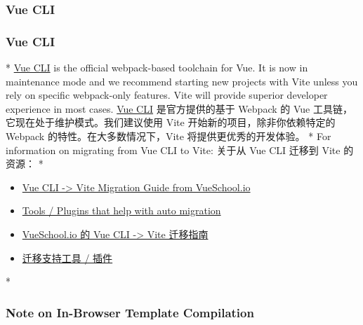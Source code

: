 \begin{paracol}{2}
\subsubsection{Vue CLI}
\switchcolumn
\subsubsection{Vue CLI}
\switchcolumn[0]*%
\href{https://cli.vuejs.org/}{Vue CLI} is the official webpack-based
toolchain for Vue. It is now in maintenance mode and we recommend
starting new projects with Vite unless you rely on specific webpack-only
features. Vite will provide superior developer experience in most cases.
\switchcolumn
\href{https://cli.vuejs.org/zh/}{Vue CLI} 是官方提供的基于 Webpack 的
Vue 工具链，它现在处于维护模式。我们建议使用 Vite
开始新的项目，除非你依赖特定的 Webpack 的特性。在大多数情况下，Vite
将提供更优秀的开发体验。
\switchcolumn[0]*%
For information on migrating from Vue CLI to Vite:
\switchcolumn
关于从 Vue CLI 迁移到 Vite 的资源：
\switchcolumn[0]*%
\begin{itemize}
\item
  \href{https://vueschool.io/articles/vuejs-tutorials/how-to-migrate-from-vue-cli-to-vite/}{Vue
  CLI -\textgreater{} Vite Migration Guide from VueSchool.io}
\item
  \href{https://github.com/vitejs/awesome-vite\#vue-cli}{Tools / Plugins
  that help with auto migration}
\end{itemize}
\switchcolumn
\begin{itemize}
\item
  \href{https://vueschool.io/articles/vuejs-tutorials/how-to-migrate-from-vue-cli-to-vite/}{VueSchool.io
  的 Vue CLI -\textgreater{} Vite 迁移指南}
\item
  \href{https://github.com/vitejs/awesome-vite\#vue-cli}{迁移支持工具 /
  插件}
\end{itemize}
\switchcolumn[0]*%
\subsubsection{Note on In-Browser Template Compilation}
\switchcolumn

\end{paracol}
